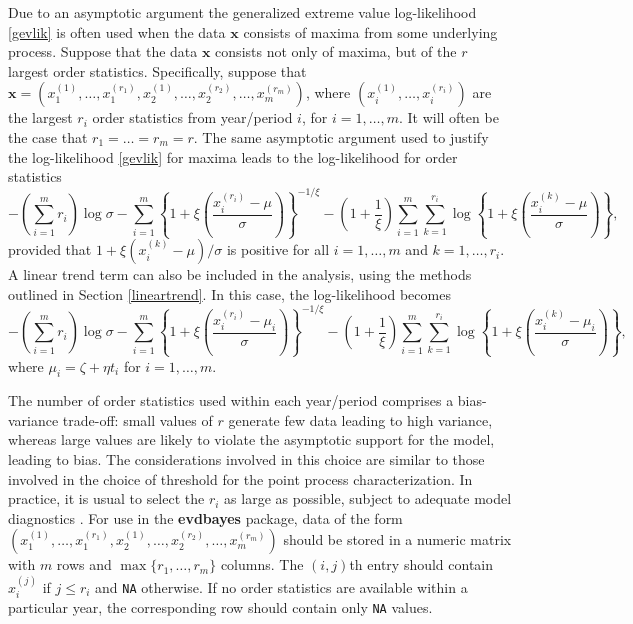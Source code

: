 \documentclass[11pt,a4paper]{article}
\newcommand{\bs}{\boldsymbol}
\begin{document}
Due to an asymptotic argument \citep[e.g.][]{cole01} the generalized extreme value log-likelihood \eqref{gevlik} is often used when the data $\bs{x}$ consists of maxima from some underlying process.
Suppose that the data $\bs{x}$ consists not only of maxima, but of the $r$ largest order statistics.
Specifically, suppose that $\bs{x} = (x_1^{(1)}, \dots, x_1^{(r_1)}, x_2^{(1)}, \dots, x_2^{(r_2)}, \dots, x_m^{(r_m)})$, where $(x_i^{(1)}, \dots, x_i^{(r_i)})$  are the largest $r_i$ order statistics from year/period $i$, for $i=1,\dots,m$.
It will often be the case that $r_1 = \dots = r_m = r$.
The same asymptotic argument used to justify the log-likelihood \eqref{gevlik} for maxima leads to the log-likelihood for order statistics
\begin{equation*}
-\left(\sum_{i=1}^m r_i\right)\log \sigma - \sum_{i=1}^{m} \left\{1 + \xi\left(\frac{x_i^{(r_i)}-\mu}{\sigma}\right)\right\}^{-1/\xi} - \left(1+\frac{1}{\xi}\right) \sum_{i=1}^{m} \sum_{k=1}^{r_i} \log\left\{1 + \xi\left(\frac{x_i^{(k)}-\mu}{\sigma}\right)\right\},
\end{equation*}
provided that $1 + \xi(x_i^{(k)}-\mu)/\sigma$ is positive for all $i=1,\dots,m$ and $k = 1,\dots,r_i$.
A linear trend term can also be included in the analysis, using the methods outlined in Section \ref{lineartrend}.
In this case, the log-likelihood becomes
\begin{equation*}
-\left(\sum_{i=1}^m r_i\right)\log \sigma - \sum_{i=1}^{m} \left\{1 + \xi\left(\frac{x_i^{(r_i)}-\mu_i}{\sigma}\right)\right\}^{-1/\xi} - \left(1+\frac{1}{\xi}\right) \sum_{i=1}^{m} \sum_{k=1}^{r_i} \log\left\{1 + \xi\left(\frac{x_i^{(k)}-\mu_i}{\sigma}\right)\right\},
\end{equation*}
where $\mu_i = \zeta + \eta t_i$ for $i=1,\dots,m$.
 
The number of order statistics used within each year/period comprises a bias-variance trade-off: small values of $r$ generate few data leading to high variance, whereas large values are likely to violate the asymptotic support for the model, leading to bias.
The considerations involved in this choice are similar to those involved in the choice of threshold for the point process characterization.
In practice, it is usual to select the $r_i$ as large as possible, subject to adequate model diagnostics \citep{cole01}.
For use in the \textbf{evdbayes} package, data of the form $(x_1^{(1)}, \dots, x_1^{(r_1)}, x_2^{(1)}, \dots, x_2^{(r_2)}, \dots, x_m^{(r_m)})$ should be stored in a numeric matrix with $m$ rows and $\max\{r_1,\dots,r_m\}$ columns.
The $(i,j)$th entry should contain $x_i^{(j)}$ if $j \leq r_i$ and \verb+NA+ otherwise.
If no order statistics are available within a particular year, the corresponding row should contain only \verb+NA+ values.
\end{document}
